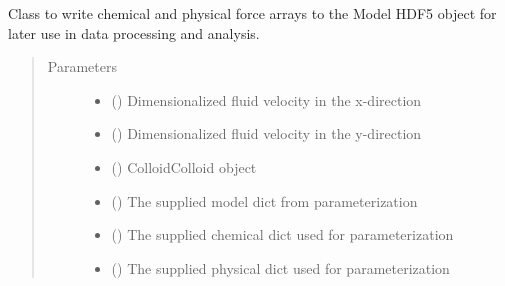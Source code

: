 \documentclass[letterpaper,10pt,english]{sphinxmanual}
\begin{document}
\begin{fulllineitems}
\label{\detokenize{index:lb_colloids.Colloids.Colloid_IO.HDF5WriteArray}}
Class to write chemical and physical force arrays to the Model HDF5 object
for later use in data processing and analysis.
\begin{quote}\begin{description}
\item[{Parameters}] \leavevmode\begin{itemize}
\item {} 
 () \textendash{} Dimensionalized fluid velocity in the x-direction

\item {} 
 () \textendash{} Dimensionalized fluid velocity in the y-direction

\item {} 
 ({\hyperref[\detokenize{index:lb_colloids.Colloids.Colloid_Math.ColloidColloid}]{}}) \textendash{} ColloidColloid object

\item {} 
 () \textendash{} The supplied model dict from parameterization

\item {} 
 () \textendash{} The supplied chemical dict used for parameterization

\item {} 
 () \textendash{} The supplied physical dict used for parameterization

\end{itemize}

\end{description}\end{quote}

\end{fulllineitems}

\end{document}
